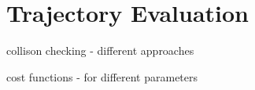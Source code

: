 


\section{Trajectory Evaluation}
\label{traj_eval}

collison checking - different approaches 

cost functions - for different parameters


